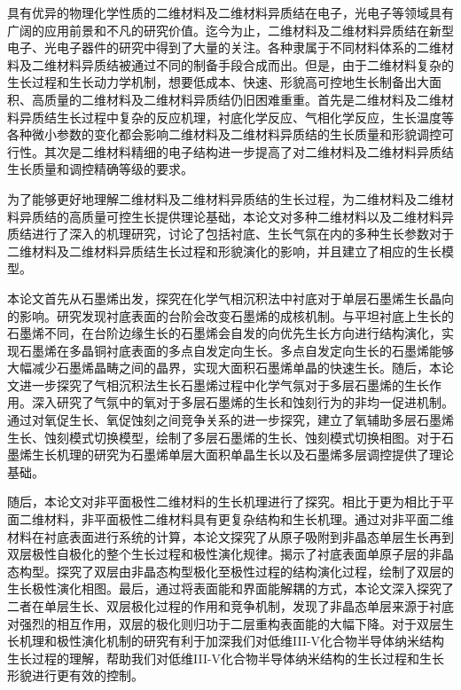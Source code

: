 \begin{chineseabstract}
    具有优异的物理化学性质的二维材料及二维材料异质结在电子，光电子等领域具有广阔的应用前景和不凡的研究价值。迄今为止，二维材料及二维材料异质结在新型电子、光电子器件的研究中得到了大量的关注。各种隶属于不同材料体系的二维材料及二维材料异质结被通过不同的制备手段合成而出。但是，由于二维材料复杂的生长过程和生长动力学机制，想要低成本、快速、形貌高可控地生长制备出大面积、高质量的二维材料及二维材料异质结仍旧困难重重。首先是二维材料及二维材料异质结生长过程中复杂的反应机理，衬底化学反应、气相化学反应，生长温度等各种微小参数的变化都会影响二维材料及二维材料异质结的生长质量和形貌调控可行性。其次是二维材料精细的电子结构进一步提高了对二维材料及二维材料异质结生长质量和调控精确等级的要求。
    
    为了能够更好地理解二维材料及二维材料异质结的生长过程，为二维材料及二维材料异质结的高质量可控生长提供理论基础，本论文对多种二维材料以及二维材料异质结进行了深入的机理研究，讨论了包括衬底、生长气氛在内的多种生长参数对于二维材料及二维材料异质结生长过程和形貌演化的影响，并且建立了相应的生长模型。

    本论文首先从石墨烯出发，探究在化学气相沉积法中衬底对于单层石墨烯生长晶向的影响。研究发现衬底表面的台阶会改变石墨烯的成核机制。与平坦衬底上生长的石墨烯不同，在台阶边缘生长的石墨烯会自发的向优先生长方向进行结构演化，实现石墨烯在多晶铜衬底表面的多点自发定向生长。多点自发定向生长的石墨烯能够大幅减少石墨烯晶畴之间的晶界，实现大面积石墨烯单晶的快速生长。随后，本论文进一步探究了气相沉积法生长石墨烯过程中化学气氛对于多层石墨烯的生长作用。深入研究了气氛中的氧对于多层石墨烯的生长和蚀刻行为的非均一促进机制。通过对氧促生长、氧促蚀刻之间竞争关系的进一步探究，建立了氧辅助多层石墨烯生长、蚀刻模式切换模型，绘制了多层石墨烯的生长、蚀刻模式切换相图。对于石墨烯生长机理的研究为石墨烯单层大面积单晶生长以及石墨烯多层调控提供了理论基础。

    随后，本论文对非平面极性二维材料的生长机理进行了探究。相比于更为相比于平面二维材料，非平面极性二维材料具有更复杂结构和生长机理。通过对非平面二维材料在衬底表面进行系统的计算，本论文探究了从原子吸附到非晶态单层生长再到双层极性自极化的整个生长过程和极性演化规律。揭示了衬底表面单原子层的非晶态构型。探究了双层由非晶态构型极化至极性过程的结构演化过程，绘制了双层的生长极性演化相图。最后，通过将表面能和界面能解耦的方式，本论文深入探究了二者在单层生长、双层极化过程的作用和竞争机制，发现了非晶态单层来源于衬底对强烈的相互作用，双层的极化则归功于二层重构表面能的大幅下降。对于双层生长机理和极性演化机制的研究有利于加深我们对低维III-V化合物半导体纳米结构生长过程的理解，帮助我们对低维III-V化合物半导体纳米结构的生长过程和生长形貌进行更有效的控制。


\end{chineseabstract}

